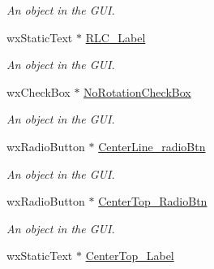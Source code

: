 \begin{DoxyCompactItemize}
\begin{DoxyCompactList}\small\item\em An object in the GUI. \item\end{DoxyCompactList}\item 
\hypertarget{classGUIFrame_aff3aa9704dbd9144ce8701a6545a303e}{
wxStaticText $\ast$ \hyperlink{classGUIFrame_aff3aa9704dbd9144ce8701a6545a303e}{RLC\_\-Label}}
\label{classGUIFrame_aff3aa9704dbd9144ce8701a6545a303e}

\begin{DoxyCompactList}\small\item\em An object in the GUI. \item\end{DoxyCompactList}\item 
\hypertarget{classGUIFrame_aca355d6a237a917fb2eae7d96974209f}{
wxCheckBox $\ast$ \hyperlink{classGUIFrame_aca355d6a237a917fb2eae7d96974209f}{NoRotationCheckBox}}
\label{classGUIFrame_aca355d6a237a917fb2eae7d96974209f}

\begin{DoxyCompactList}\small\item\em An object in the GUI. \item\end{DoxyCompactList}\item 
\hypertarget{classGUIFrame_a5ef121cae8873dd15cbd531170796316}{
wxRadioButton $\ast$ \hyperlink{classGUIFrame_a5ef121cae8873dd15cbd531170796316}{CenterLine\_\-radioBtn}}
\label{classGUIFrame_a5ef121cae8873dd15cbd531170796316}

\begin{DoxyCompactList}\small\item\em An object in the GUI. \item\end{DoxyCompactList}\item 
\hypertarget{classGUIFrame_a424784f86c784b9877ce3c445bd6729e}{
wxRadioButton $\ast$ \hyperlink{classGUIFrame_a424784f86c784b9877ce3c445bd6729e}{CenterTop\_\-RadioBtn}}
\label{classGUIFrame_a424784f86c784b9877ce3c445bd6729e}

\begin{DoxyCompactList}\small\item\em An object in the GUI. \item\end{DoxyCompactList}\item 
\hypertarget{classGUIFrame_ad34bc16d279ab87cdc3e732cc081b6fc}{
wxStaticText $\ast$ \hyperlink{classGUIFrame_ad34bc16d279ab87cdc3e732cc081b6fc}{CenterTop\_\-Label}}
\label{classGUIFrame_ad34bc16d279ab87cdc3e732cc081b6fc}


\end{DoxyCompactItemize}
